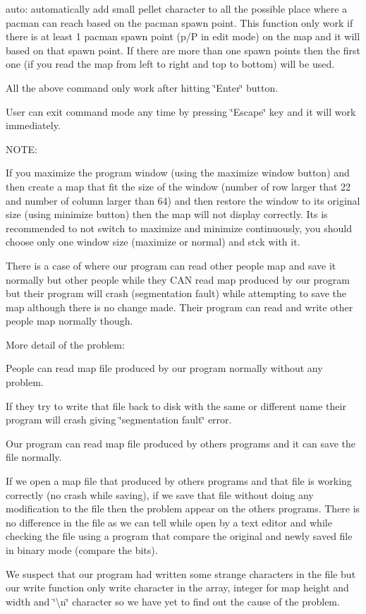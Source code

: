 \begin{DoxyEnumerate}
auto\-: automatically add small pellet character to all the possible place where a pacman can reach based on the pacman spawn point. This function only work if there is at least 1 pacman spawn point (p/\-P in edit mode) on the map and it will based on that spawn point. If there are more than one spawn points then the first one (if you read the map from left to right and top to bottom) will be used.

All the above command only work after hitting \char`\"{}\-Enter\char`\"{} button.

User can exit command mode any time by pressing \char`\"{}\-Escape\char`\"{} key and it will work immediately.

N\-O\-T\-E\-:

If you maximize the program window (using the maximize window button) and then create a map that fit the size of the window (number of row larger that 22 and number of column larger than 64) and then restore the window to its original size (using minimize button) then the map will not display correctly. Its is recommended to not switch to maximize and minimize continuously, you should choose only one window size (maximize or normal) and stck with it.

There is a case of where our program can read other people map and save it normally but other people while they C\-A\-N read map produced by our program but their program will crash (segmentation fault) while attempting to save the map although there is no change made. Their program can read and write other people map normally though.

More detail of the problem\-:

People can read map file produced by our program normally without any problem.

If they try to write that file back to disk with the same or different name their program will crash giving \char`\"{}segmentation fault\char`\"{} error.

Our program can read map file produced by others programs and it can save the file normally.

If we open a map file that produced by others programs and that file is working correctly (no crash while saving), if we save that file without doing any modification to the file then the problem appear on the others programs. There is no difference in the file as we can tell while open by a text editor and while checking the file using a program that compare the original and newly saved file in binary mode (compare the bits).

We suspect that our program had written some strange characters in the file but our write function only write character in the array, integer for map height and width and \char`\"{}\textbackslash{}n\char`\"{} character so we have yet to find out the cause of the problem.
\end{DoxyEnumerate}

